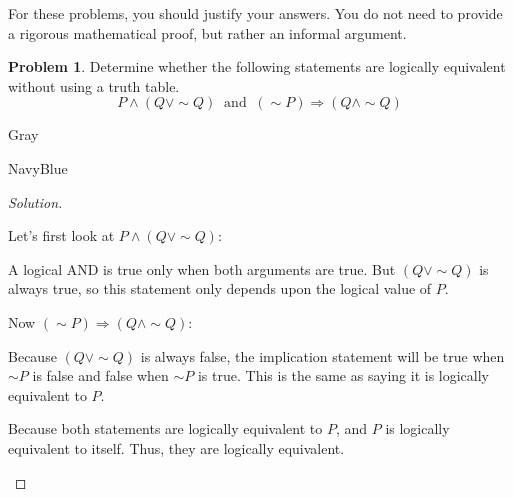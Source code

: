 \documentclass[12pt]{amsart}
\newcounter{problem_number}[section]
\theoremstyle{named}
\newenvironment{soln}
{\begin{color}{Gray}\begin{framed}\begin{color}{NavyBlue}\begin{proof}[Solution]
\doublespacing}
{\end{proof}\end{color}\end{framed}\end{color}}
\theoremstyle{definition}
\newtheorem{problem}{Problem}
\begin{document}
For these problems, you should justify your answers. You do not need to provide a rigorous mathematical proof, but rather an informal argument.

\vspace{5mm}



\begin{problem}
	Determine whether the following statements are logically equivalent without using a truth table.
	$$P\wedge(Q\vee\sim Q)\ \text{ and }\ (\sim P)\Rightarrow (Q\wedge\sim Q)$$
\end{problem}

\begin{soln}
	\phantom{ }
    \begin{adjustwidth}{2em}{0em} 
        Let's first look at $P \land (Q \lor \sim Q)$:
        \begin{adjustwidth}{2em}{0em} 
            A logical AND is true only when both arguments are true.
            But $(Q \lor \sim Q)$ is always true, so this statement
            only depends upon the logical value of $P$. 
        \end{adjustwidth}

        \noindent Now $(\sim P)\Rightarrow (Q\wedge\sim Q)$:
        \begin{adjustwidth}{2em}{0em}
            Because $(Q \lor \sim Q)$ is always false, the implication
            statement will be true when $\sim P$ is false and false when
            $\sim P$ is true. This is the same as saying it is logically equivalent
            to $P$. 
        \end{adjustwidth}

        \noindent Because both statements are logically equivalent to $P$, and $P$ is
        logically equivalent to itself. Thus, they are logically equivalent.
    \end{adjustwidth}
    \phantom{ }

    \phantom{ }

    \phantom{ }

    \phantom{ }

    \phantom{ }

    \phantom{ }

    \phantom{ }

    \phantom{ }

    \phantom{ }

    \phantom{ }

    \phantom{ }

    \phantom{ }

    \phantom{ }
\end{soln}
\end{document}
